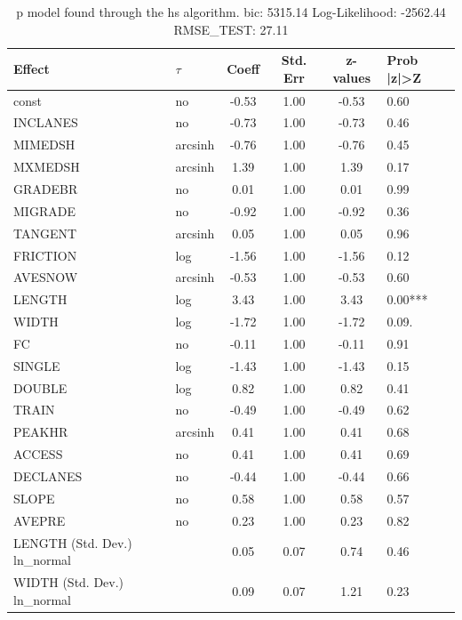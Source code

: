 \begin{table}
	\caption{p model found through the hs algorithm. bic: 5315.14 Log-Likelihood: -2562.44 RMSE_TEST: 27.11}
	\begin{center}
		\begin{tabular}{|l|l|c|c|c|l|}
			\hline
			Effect & $\tau$ & Coeff & Std. Err & z-values & Prob |z|>Z \\
			\hline
			const & no & -0.53 & 1.00 & -0.53 & 0.60 \\
			\hline
			INCLANES & no & -0.73 & 1.00 & -0.73 & 0.46 \\
			\hline
			MIMEDSH & arcsinh & -0.76 & 1.00 & -0.76 & 0.45 \\
			\hline
			MXMEDSH & arcsinh & 1.39 & 1.00 & 1.39 & 0.17 \\
			\hline
			GRADEBR & no & 0.01 & 1.00 & 0.01 & 0.99 \\
			\hline
			MIGRADE & no & -0.92 & 1.00 & -0.92 & 0.36 \\
			\hline
			TANGENT & arcsinh & 0.05 & 1.00 & 0.05 & 0.96 \\
			\hline
			FRICTION & log & -1.56 & 1.00 & -1.56 & 0.12 \\
			\hline
			AVESNOW & arcsinh & -0.53 & 1.00 & -0.53 & 0.60 \\
			\hline
			LENGTH & log & 3.43 & 1.00 & 3.43 & 0.00*** \\
			\hline
			WIDTH & log & -1.72 & 1.00 & -1.72 & 0.09. \\
			\hline
			FC & no & -0.11 & 1.00 & -0.11 & 0.91 \\
			\hline
			SINGLE & log & -1.43 & 1.00 & -1.43 & 0.15 \\
			\hline
			DOUBLE & log & 0.82 & 1.00 & 0.82 & 0.41 \\
			\hline
			TRAIN & no & -0.49 & 1.00 & -0.49 & 0.62 \\
			\hline
			PEAKHR & arcsinh & 0.41 & 1.00 & 0.41 & 0.68 \\
			\hline
			ACCESS & no & 0.41 & 1.00 & 0.41 & 0.69 \\
			\hline
			DECLANES & no & -0.44 & 1.00 & -0.44 & 0.66 \\
			\hline
			SLOPE & no & 0.58 & 1.00 & 0.58 & 0.57 \\
			\hline
			AVEPRE & no & 0.23 & 1.00 & 0.23 & 0.82 \\
			\hline
			LENGTH (Std. Dev.) ln_normal &  & 0.05 & 0.07 & 0.74 & 0.46 \\
			\hline
			WIDTH (Std. Dev.) ln_normal &  & 0.09 & 0.07 & 1.21 & 0.23 \\

\end{tabular}
\end{center}
\end{table}
